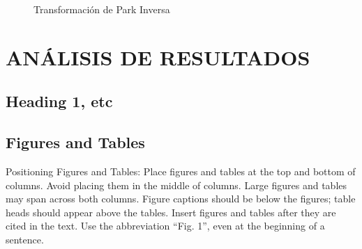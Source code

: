 \documentclass[a4paper, 10pt, onecolumn,journal]{ieeeconf}
\begin{document}
\begin{figure}[thpb]
    \centering
    \begin{adjustbox}{max width=\columnwidth}
    \end{adjustbox}
    \caption{Transformación de Park Inversa}
    \label{transformación de park inversa}
\end{figure}




























\section{ANÁLISIS DE RESULTADOS}


\subsection{Heading 1, etc}


\subsection{Figures and Tables}

Positioning Figures and Tables: Place figures and tables at the top and bottom of columns. Avoid placing them in the middle of columns. Large figures and tables may span across both columns. Figure captions should be below the figures; table heads should appear above the tables. Insert figures and tables after they are cited in the text. Use the abbreviation ``Fig. 1'', even at the beginning of a sentence.
\end{document}
